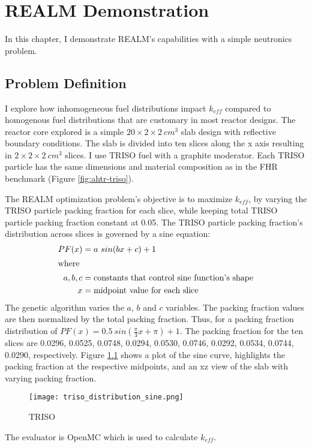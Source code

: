 \chapter{REALM Demonstration}
In this chapter, I demonstrate \gls{REALM}'s capabilities with a simple neutronics 
problem. 

\section{Problem Definition}
I explore how inhomogeneous fuel distributions impact $k_{eff}$ compared to 
homogenous fuel distributions that are customary in most reactor designs. 
The reactor core explored is a simple $20 \times 2 \times 2\ cm^3$ slab design
with reflective boundary conditions. 
The slab is divided into ten slices along the x axis resulting in 
$2 \times 2 \times 2\ cm^3$ slices. 
I use \gls{TRISO} fuel with a graphite moderator.
Each \gls{TRISO} particle has the same dimensions and material composition 
as in the \gls{FHR} benchmark (Figure \ref{fig:ahtr-triso}). 

The \gls{REALM} optimization problem's objective is to maximize $k_{eff}$, by 
varying the \gls{TRISO} particle packing fraction for each slice, while keeping 
total \gls{TRISO} particle packing fraction constant at 0.05. 
The \gls{TRISO} particle packing fraction's distribution across slices is 
governed by a sine equation: 
\begin{align}
    PF(x) &= a\ sin(bx + c) + 1 \\
    \intertext{where}
    a, b, c &= \mbox{constants that control sine function's shape} \nonumber \\
    x &= \mbox{midpoint value for each slice} \nonumber
\end{align}
The genetic algorithm varies the $a$, $b$ and $c$ variables. 
The packing fraction values are then normalized by the total packing fraction. 
Thus, for a packing fraction distribution of 
$PF(x) = 0.5\ sin(\frac{\pi}{3}x + \pi) + 1 $. 
The packing fraction for the ten slices are 0.0296, 0.0525, 0.0748, 0.0294, 
0.0530, 0.0746, 0.0292, 0.0534, 0.0744, 0.0290, respectively. 
Figure \ref{fig:triso_distribution} shows a plot of the sine curve, highlights 
the packing fraction at the respective midpoints, and an xz view of the slab
with varying packing fraction. 
\begin{figure}[]
    \centering
    \texttt{[image: triso\_distribution\_sine.png]} 
    \caption{TRISO}
    \label{fig:triso_distribution}
\end{figure}
The evaluator is OpenMC which is used to calculate $k_{eff}$. 


